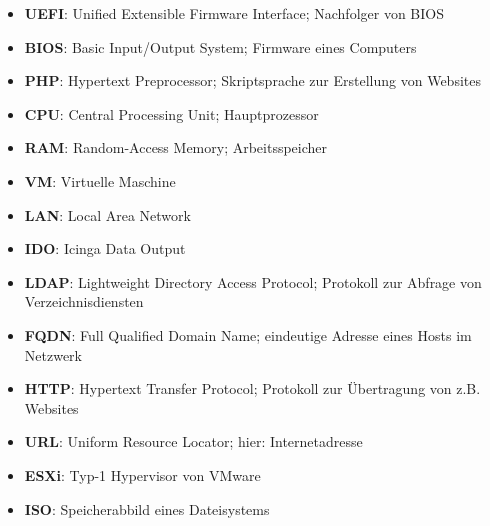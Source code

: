 
%


\begin{itemize}
	\item \textbf{UEFI}: Unified Extensible Firmware Interface; Nachfolger von BIOS
	\item \textbf{BIOS}: Basic Input/Output System; Firmware eines Computers
	\item \textbf{PHP}: Hypertext Preprocessor; Skriptsprache zur Erstellung von Websites
	\item \textbf{CPU}: Central Processing Unit; Hauptprozessor
	\item \textbf{RAM}: Random-Access Memory; Arbeitsspeicher
	\item \textbf{VM}: Virtuelle Maschine
	\item \textbf{LAN}: Local Area Network
	\item \textbf{IDO}: Icinga Data Output
	\item \textbf{LDAP}: Lightweight Directory Access Protocol; Protokoll zur Abfrage von Verzeichnisdiensten
	\item \textbf{FQDN}: Full Qualified Domain Name; eindeutige Adresse eines Hosts im Netzwerk
	\item \textbf{HTTP}: Hypertext Transfer Protocol; Protokoll zur Übertragung von z.B. Websites
	\item \textbf{URL}: Uniform Resource Locator; hier: Internetadresse
	\item \textbf{ESXi}: Typ-1 Hypervisor von VMware
	\item \textbf{ISO}: Speicherabbild eines Dateisystems
\end{itemize}

\begin{acronym}[WWWW]
\end{acronym}

